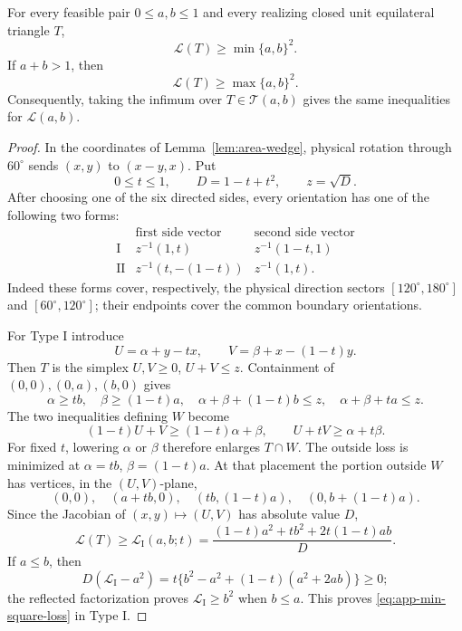 \begin{lemma}
\label{lem:app-local-square-loss-calculation}
For every feasible pair $0\le a,b\le1$ and every realizing closed unit
equilateral triangle $T$,
\begin{equation}
 \mathcal L(T)\ge\min\{a,b\}^2.                  \label{eq:app-min-square-loss}
\end{equation}
If $a+b>1$, then
\begin{equation}
 \mathcal L(T)\ge\max\{a,b\}^2.                  \label{eq:app-max-square-loss}
\end{equation}
Consequently, taking the infimum over $T\in\mathcal T(a,b)$ gives the same
inequalities for $\mathcal L(a,b)$.
\end{lemma}

\begin{proof}
In the coordinates of Lemma~\ref{lem:area-wedge}, physical rotation through
$60^\circ$ sends $(x,y)$ to $(x-y,x)$.  Put
\[
 0\le t\le1,\qquad D=1-t+t^2,\qquad z=\sqrt D.
\]
After choosing one of the six directed sides, every orientation has one of
the following two forms:
\begin{equation}
 \begin{array}{c|cc}
 &\text{first side vector}&\text{second side vector}\\ \hline
 \mathrm{I}&z^{-1}(1,t)&z^{-1}(1-t,1)\\[2mm]
 \mathrm{II}&z^{-1}(t,-(1-t))&z^{-1}(1,t).
 \end{array}                                      \label{eq:area-orientation-forms}
\end{equation}
Indeed these forms cover, respectively, the physical direction sectors
$[120^\circ,180^\circ]$ and $[60^\circ,120^\circ]$; their endpoints cover
the common boundary orientations.

For Type I introduce
\[
 U=\alpha+y-tx,\qquad V=\beta+x-(1-t)y.
\]
Then $T$ is the simplex $U,V\ge0$, $U+V\le z$.  Containment of
$(0,0),(0,a),(b,0)$ gives
\begin{equation}
 \alpha\ge tb,\quad \beta\ge(1-t)a,
 \quad \alpha+\beta+(1-t)b\le z,
 \quad \alpha+\beta+ta\le z.                 \label{eq:area-type-I-containment}
\end{equation}
The two inequalities defining $W$ become
\[
 (1-t)U+V\ge(1-t)\alpha+\beta,
 \qquad U+tV\ge\alpha+t\beta.
\]
For fixed $t$, lowering $\alpha$ or $\beta$ therefore enlarges $T\cap W$.
The outside loss is minimized at
$\alpha=tb$, $\beta=(1-t)a$.  At that placement the portion outside $W$
has vertices, in the $(U,V)$-plane,
\[
 (0,0),\quad(a+tb,0),\quad(tb,(1-t)a),
 \quad(0,b+(1-t)a).
\]
Since the Jacobian of $(x,y)\mapsto(U,V)$ has absolute value $D$,
\begin{equation}
 \mathcal L(T)\ge \mathcal L_{\mathrm I}(a,b;t)
 =\frac{(1-t)a^2+tb^2+2t(1-t)ab}{D}.          \label{eq:type-I-loss}
\end{equation}
If $a\le b$, then
\[
 D(\mathcal L_{\mathrm I}-a^2)
 =t\{b^2-a^2+(1-t)(a^2+2ab)\}\ge0;
\]
the reflected factorization proves $\mathcal L_{\mathrm I}\ge b^2$ when $b\le a$.
This proves \eqref{eq:app-min-square-loss} in Type I.


\end{proof}
